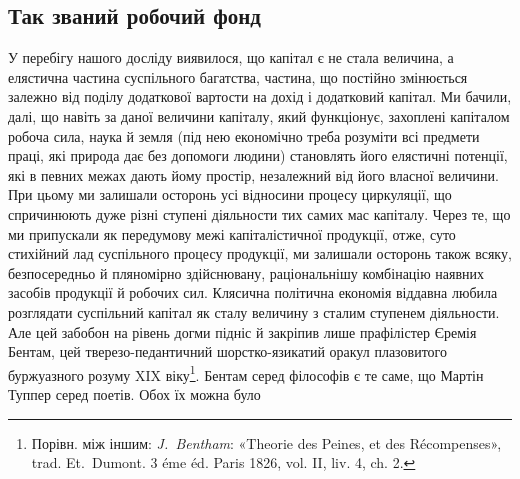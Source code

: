 
\subsection{Так званий робочий фонд}

У перебігу нашого досліду виявилося, що капітал є не стала
величина, а елястична частина суспільного багатства, частина,
що постійно змінюється залежно від поділу додаткової вартости
на дохід і додатковий капітал. Ми бачили, далі, що навіть за
даної величини капіталу, який функціонує, захоплені капіталом
робоча сила, наука й земля (під нею економічно треба розуміти
всі предмети праці, які природа дає без допомоги людини) становлять
його елястичні потенції, які в певних межах дають йому
простір, незалежний від його власної величини. При цьому ми
залишали осторонь усі відносини процесу циркуляції, що спричинюють
дуже різні ступені діяльности тих самих мас капіталу.
Через те, що ми припускали як передумову межі капіталістичної
продукції, отже, суто стихійний лад суспільного процесу продукції,
ми залишали осторонь також всяку, безпосередньо й пляномірно
здійснювану, раціональнішу комбінацію наявних засобів
продукції й робочих сил. Клясична політична економія віддавна
любила розглядати суспільний капітал як сталу величину
з сталим ступенем діяльности. Але цей забобон на рівень догми
підніс й закріпив лише прафілістер Єремія Бентам, цей тверезо-педантичний
шорстко-язикатий оракул плазовитого буржуазного
розуму XIX віку\footnote{
Порівн. між іншим: \emph{J.~Bentham}: «Theorie des Peines, et des Récompenses»,
trad. Et.~Dumont. 3 éme éd. Paris 1826, vol. II, liv. 4, ch. 2.
}. Бентам серед філософів є те
саме, що Мартін Туппер серед поетів. Обох їх можна було
